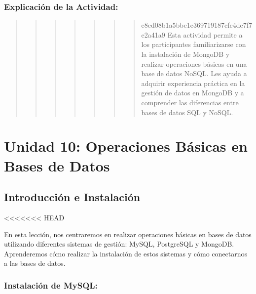 \documentclass[
  a4paper,
  onepage,
  openany]{scrreprt}
\begin{document}
\hypertarget{explicaciuxf3n-de-la-actividad-69}{%
\section{Explicación de la
Actividad:}\label{explicaciuxf3n-de-la-actividad-69}}

\begin{quote}
\begin{quote}
\begin{quote}
\begin{quote}
\begin{quote}
\begin{quote}
\begin{quote}
e8ed08b1a5bbe1e369719187cfc4de7f7e2a41a9 Esta actividad permite a los
participantes familiarizarse con la instalación de MongoDB y realizar
operaciones básicas en una base de datos NoSQL. Les ayuda a adquirir
experiencia práctica en la gestión de datos en MongoDB y a comprender
las diferencias entre bases de datos SQL y NoSQL.
\end{quote}
\end{quote}
\end{quote}
\end{quote}
\end{quote}
\end{quote}
\end{quote}

\part{Unidad 10: Operaciones Básicas en Bases de Datos}

\hypertarget{introducciuxf3n-e-instalaciuxf3n}{%
\chapter{Introducción e
Instalación}\label{introducciuxf3n-e-instalaciuxf3n}}

\textless\textless\textless\textless\textless\textless\textless{} HEAD

En esta lección, nos centraremos en realizar operaciones básicas en
bases de datos utilizando diferentes sistemas de gestión: MySQL,
PostgreSQL y MongoDB. Aprenderemos cómo realizar la instalación de estos
sistemas y cómo conectarnos a las bases de datos.

\hypertarget{instalaciuxf3n-de-mysql}{%
\section{Instalación de MySQL:}\label{instalaciuxf3n-de-mysql}}
\end{document}
